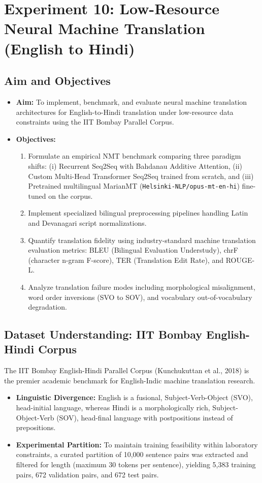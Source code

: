 \documentclass[12pt,a4paper]{report}
\begin{document}
\section{Experiment 10: Low-Resource Neural Machine Translation (English to Hindi)}

\subsection{Aim and Objectives}
\begin{itemize}
    \item \textbf{Aim:} To implement, benchmark, and evaluate neural machine translation architectures for English-to-Hindi translation under low-resource data constraints using the IIT Bombay Parallel Corpus.
    \item \textbf{Objectives:}
    \begin{enumerate}
        \item Formulate an empirical NMT benchmark comparing three paradigm shifts: (i) Recurrent Seq2Seq with Bahdanau Additive Attention, (ii) Custom Multi-Head Transformer Seq2Seq trained from scratch, and (iii) Pretrained multilingual MarianMT (\texttt{Helsinki-NLP/opus-mt-en-hi}) fine-tuned on the corpus.
        \item Implement specialized bilingual preprocessing pipelines handling Latin and Devanagari script normalizations.
        \item Quantify translation fidelity using industry-standard machine translation evaluation metrics: BLEU (Bilingual Evaluation Understudy), chrF (character n-gram F-score), TER (Translation Edit Rate), and ROUGE-L.
        \item Analyze translation failure modes including morphological misalignment, word order inversions (SVO to SOV), and vocabulary out-of-vocabulary degradation.
    \end{enumerate}
\end{itemize}

\subsection{Dataset Understanding: IIT Bombay English-Hindi Corpus}
The IIT Bombay English-Hindi Parallel Corpus (Kunchukuttan et al., 2018) is the premier academic benchmark for English-Indic machine translation research. 
\begin{itemize}
    \item \textbf{Linguistic Divergence:} English is a fusional, Subject-Verb-Object (SVO), head-initial language, whereas Hindi is a morphologically rich, Subject-Object-Verb (SOV), head-final language with postpositions instead of prepositions.
    \item \textbf{Experimental Partition:} To maintain training feasibility within laboratory constraints, a curated partition of 10,000 sentence pairs was extracted and filtered for length (maximum 30 tokens per sentence), yielding 5,383 training pairs, 672 validation pairs, and 672 test pairs.
\end{itemize}
\end{document}
